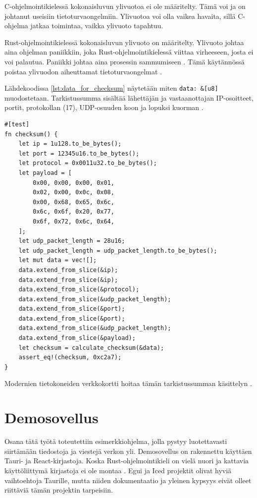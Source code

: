 \documentclass[a4paper,12pt]{article}
\begin{document}
    C-ohjelmointikielessä kokonaisluvun ylivuotoa ei ole määritelty. Tämä voi ja on johtanut useisiin tietoturvaongelmiin. Ylivuotoa voi olla vaikea havaita, sillä C-ohjelma jatkaa toimintaa, vaikka ylivuoto tapahtuu.\par
    Rust-ohjelmointikielessä kokonaisluvun ylivuoto on määritelty. Ylivuoto johtaa aina ohjelman paniikkiin, joka Rust-ohjelmointikielessä viittaa virheeseen, josta ei voi palautua. Paniikki johtaa aina prosessin sammumiseen \cite[luku 9.3]{rust-book}. Tämä käytännössä poistaa ylivuodon aiheuttamat tietoturvaongelmat \cite[luku 3.2]{rust-book}.

    Lähdekoodissa \ref{lst:data_for_checksum} näytetään miten \lstinline{data: &[u8]} muodostetaan. Tarkistussumma sisältää lähettäjän ja vastaanottajan IP-osoitteet, portit, protokollan (17), UDP-osuuden koon ja lopuksi kuorman \cite{RFC-768, protocol-numbers}. \par

\newpage

        \begin{lstlisting}[caption={Tietojen kasaaminen tarkistussummaa varten.}, label={lst:data_for_checksum}]
#[test]
fn checksum() {
    let ip = 1u128.to_be_bytes();
    let port = 12345u16.to_be_bytes();
    let protocol = 0x0011u32.to_be_bytes();
    let payload = [
        0x00, 0x00, 0x00, 0x01,
        0x02, 0x00, 0x0c, 0x08,
        0x00, 0x68, 0x65, 0x6c,
        0x6c, 0x6f, 0x20, 0x77,
        0x6f, 0x72, 0x6c, 0x64,
    ];
    let udp_packet_length = 28u16;
    let udp_packet_length = udp_packet_length.to_be_bytes();
    let mut data = vec![];
    data.extend_from_slice(&ip);
    data.extend_from_slice(&ip);
    data.extend_from_slice(&protocol);
    data.extend_from_slice(&udp_packet_length);
    data.extend_from_slice(&port);
    data.extend_from_slice(&port);
    data.extend_from_slice(&udp_packet_length);
    data.extend_from_slice(&payload);
    let checksum = calculate_checksum(&data);
    assert_eq!(checksum, 0xc2a7);
}\end{lstlisting}

    Modernien tietokoneiden verkkokortti hoitaa tämän tarkistussumman käsittelyn \cite{VivianoTCP/IPOverview}.


    \section{Demosovellus}\label{sec:demo}

    Osana tätä työtä toteutettiin esimerkkiohjelma, jolla pystyy luotettavasti siirtämään tiedostoja ja viestejä verkon yli. Demosovellus on rakennettu käyttäen Tauri- ja React-kirjastoja. Koska Rust-ohjelmointikieli on vielä nuori ja kattavia käyttöliittymä kirjastoja ei ole montaa \cite{AreYet}. 
    Egui ja Iced projektit olivat hyviä vaihtoehtoja Taurille, mutta niiden dokumentaatio ja yleinen kypsyys eivät olleet riittäviä tämän projektin tarpeisiin. \par
\end{document}
